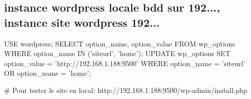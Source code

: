 \subsection*{instance wordpress locale bdd sur 192..., instance site wordpress 192...}


\begin{DoxyCode}
USE wordpress;
SELECT option\_name, option\_value FROM wp\_options WHERE option\_name IN ('siteurl', 'home');
UPDATE wp\_options SET option\_value = 'http://192.168.1.188:9500' WHERE option\_name = 'siteurl' OR
       option\_name = 'home';

# Pour tester le site en local:
http://192.168.1.188:9500/wp-admin/install.php
\end{DoxyCode}
 